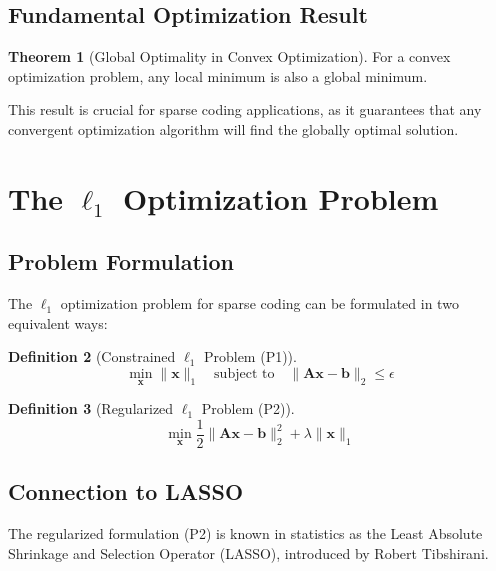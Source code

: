 \documentclass[12pt]{article}
\renewcommand{\vec}[1]{\mathbf{#1}}
\newcommand{\norm}[1]{\lVert#1\rVert}
\theoremstyle{definition}
\newtheorem{theorem}{Theorem}[section]
\newtheorem{definition}[theorem]{Definition}
\begin{document}
\subsection{Fundamental Optimization Result}

\begin{theorem}[Global Optimality in Convex Optimization]
    For a convex optimization problem, any local minimum is also a global minimum.
\end{theorem}

This result is crucial for sparse coding applications, as it guarantees that any convergent optimization algorithm will find the globally optimal solution.

\newpage

\section{The $\ell_1$ Optimization Problem}

\subsection{Problem Formulation}

The $\ell_1$ optimization problem for sparse coding can be formulated in two equivalent ways:

\begin{definition}[Constrained $\ell_1$ Problem (P1)]
    \begin{equation}
        \min_{\vec{x}} \norm{\vec{x}}_1 \quad \text{subject to} \quad \norm{\mathbf{A}\vec{x} - \vec{b}}_2 \leq \epsilon
    \end{equation}
\end{definition}

\begin{definition}[Regularized $\ell_1$ Problem (P2)]
    \begin{equation}
        \min_{\vec{x}} \frac{1}{2}\norm{\mathbf{A}\vec{x} - \vec{b}}_2^2 + \lambda \norm{\vec{x}}_1
    \end{equation}
\end{definition}

\subsection{Connection to LASSO}

The regularized formulation (P2) is known in statistics as the Least Absolute Shrinkage and Selection Operator (LASSO), introduced by Robert Tibshirani.
\end{document}
